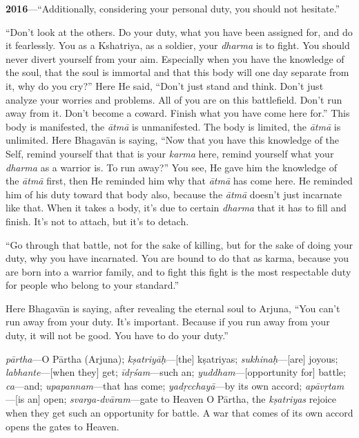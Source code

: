 \textbf{2016}---“Additionally, considering your personal duty, you should not hesitate.”

“Don’t look at the others. Do your duty, what you have been assigned for, and do it fearlessly. You as a Kshatriya, as a soldier, your \textit{dharma} is to fight. You should never divert yourself from your aim. Especially when you have the knowledge of the soul, that the soul is immortal and that this body will one day separate from it, why do you cry?” Here He said, “Don’t just stand and think. Don’t just analyze your worries and problems. All of you are on this battlefield. Don’t run away from it. Don’t become a coward. Finish what you have come here for.” This body is manifested, the \textit{ātmā} is unmanifested. The body is limited, the \textit{ātmā} is unlimited. Here Bhagavān is saying, “Now that you have this knowledge of the Self, remind yourself that that is your \textit{karma} here, remind yourself what your \textit{dharma} as a warrior is. To run away?” You see, He gave him the knowledge of the \textit{ātmā} first, then He reminded him why that \textit{ātmā} has come here. He reminded him of his duty toward that body also, because the \textit{ātmā} doesn’t just incarnate like that. When it takes a body, it’s due to certain \textit{dharma} that it has to fill and finish. It’s not to attach, but it’s to detach.

“Go through that battle, not for the sake of killing, but for the sake of doing your duty, why you have incarnated. You are bound to do that as karma, because you are born into a warrior family, and to fight this fight is the most respectable duty for people who belong to your standard.”

Here Bhagavān is saying, after revealing the eternal soul to Arjuna, “You can’t run away from your duty. It’s important. Because if you run away from your duty, it will not be good. You have to do your duty.”

{%
  \textit{pārtha}---O Pārtha (Arjuna); 
  \textit{kṣatriyāḥ}---[the] kṣatriyas; 
  \textit{sukhinaḥ}---[are] joyous; 
  \textit{labhante}---[when they] get; 
  \textit{īdṛśam}---such an; 
  \textit{yuddham}---[opportunity for] battle; 
  \textit{ca}---and; 
  \textit{upapannam}---that has come; 
  \textit{yadṛcchayā}---by its own accord; 
  \textit{apāvṛtam}---[is an] open; 
  \textit{svarga-dvāram}---gate to Heaven
}
{%
  O Pārtha, the \textit{kṣatriyas} rejoice when they get such an opportunity for battle. A war that comes of its own accord opens the gates to Heaven.
}

